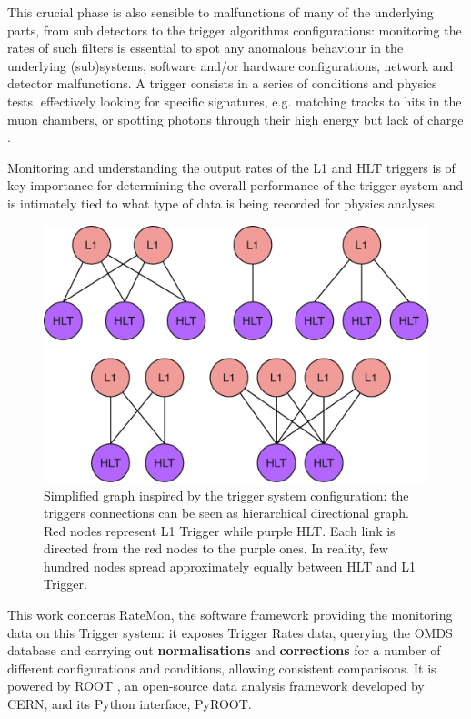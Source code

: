 \documentclass[a4, oneside, 10pt, nobib]{memoir}
\begin{document}
		This crucial phase is also sensible to malfunctions of many of the underlying parts, from sub detectors to the trigger algorithms configurations: monitoring the rates of such filters is essential to spot any anomalous behaviour in the underlying (sub)systems, software and/or hardware configurations, network and detector malfunctions. A trigger consists in a series of conditions and physics tests, effectively looking for specific signatures, e.g. matching tracks to hits in the muon chambers, or spotting photons through their high energy but lack of charge \cite{TriggeringandDataAcquisitionCMSExperiment-2020-10-12}.



		Monitoring and understanding the output rates of the L1 and HLT triggers is of key importance for determining the overall performance of the trigger system and is intimately tied to what type of data is being recorded for physics analyses.


\begin{figure}[H]
    \centerline{
        \includegraphics[width=0.35\paperwidth]{figures/triggers.pdf}}
    \caption{Simplified graph inspired by the trigger system configuration: the triggers connections can be seen as hierarchical directional graph. Red nodes represent L1 Trigger while purple HLT. Each link is directed from the red nodes to the purple ones. In reality, few hundred nodes spread approximately equally between HLT and L1 Trigger. \cite{adpol-cvae}}
    \label{fig:triggers}
\end{figure}



		This work concerns RateMon, the software framework providing the monitoring data on this Trigger system: it exposes Trigger Rates data, querying the OMDS database and carrying out \textbf{normalisations} and \textbf{corrections} for a number of different configurations and conditions, allowing consistent comparisons. It is powered by ROOT \cite{Brun:1997pa}, an open-source data analysis framework developed by CERN, and its Python interface, PyROOT.
\end{document}
